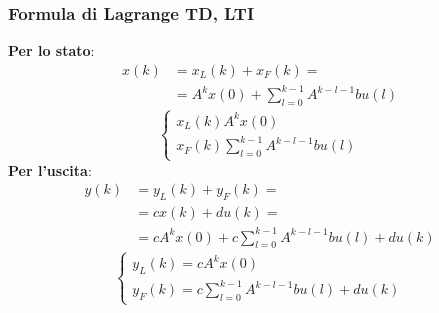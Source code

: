 \begin{landscape}
\begin{multicols*}{3}
    \subsubsection*{Formula di Lagrange TD, LTI}
    \textbf{Per lo stato}:
    \[
            \begin{split}
            x(k) &= x_L(k) + x_F(k) =\\
            &=A^k x(0) + \sum_{l=0}^{k-1}A^{k-l-1}bu(l)
            \end{split}
    \]
    \[
        \begin{cases}
            x_L(k) A^k x(0)\\
            x_F(k) \sum_{l=0}^{k-1}A^{k-l-1}bu(l)
        \end{cases}
    \]
    \textbf{Per l'uscita}:
    \[
        \begin{split}
            y(k) &= y_L(k) + y_F(k) =\\
            &= cx(k)+du(k) = \\
            &=cA^k x(0) + c\sum_{l=0}^{k-1}A^{k-l-1}bu(l) + du(k)
        \end{split}
    \]
    \[
        \begin{cases}
            y_L(k) = cA^k x(0)\\
            y_F(k) = c\sum_{l=0}^{k-1}A^{k-l-1}bu(l) + du(k)
        \end{cases}
    \]

\end{multicols*}
\end{landscape}
